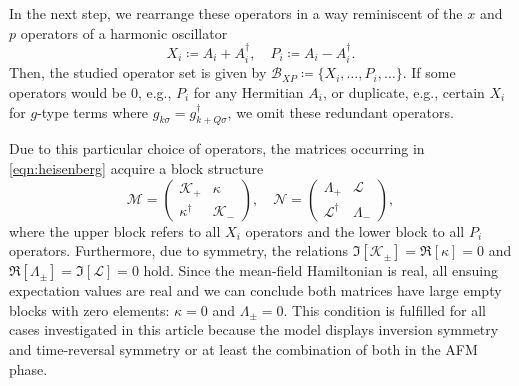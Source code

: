 \documentclass[
    reprint, 
    aps,
    preprintnumbers,
    twocolumn,
    prb,
    superscriptaddress
]{revtex4-2}
\newcommand{\mM}{\mathcal{M}}
\newcommand{\mN}{\mathcal{N}}
\begin{document}
In the next step, we rearrange these operators in a way reminiscent of the $x$ and $p$ operators
of a harmonic oscillator
\begin{equation}
    X_i \coloneqq  A_i + A_i^\dagger,\quad P_i \coloneqq  A_i - A_i^\dagger.
\end{equation}
Then, the studied operator set is given by $\mathcal{B}_{XP} \coloneqq \{ X_i, \ldots, P_i, \ldots \}$.
If some operators would be 0, e.g., $P_i$ for any Hermitian $A_i$, or duplicate, e.g., certain $X_i$ for $g$-type terms where $g_{k\sigma} = g_{k+Q\sigma}^\dagger$, we omit these redundant operators.

Due to this particular choice of operators, the matrices occurring in \eqref{eqn:heisenberg} acquire a block structure
\begin{equation}
    \label{eqn:xp_set}
    \mM = \begin{pmatrix}
        \mathcal{K}_+ & \kappa \\ \kappa^\dagger & \mathcal{K}_-
    \end{pmatrix},\quad \mN = \begin{pmatrix}
        \Lambda_+ & \mathcal{L} \\ \mathcal{L}^\dagger & \Lambda_-
    \end{pmatrix},
\end{equation}
where the upper block refers to all $X_i$ operators and the lower block to all $P_i$ operators.
Furthermore, due to symmetry, the relations $\Im [\mathcal{K}_\pm] = \Re [\kappa] = 0$ and $\Re [\Lambda_\pm] = \Im [\mathcal{L}] = 0$ hold.
Since the mean-field Hamiltonian is real, all ensuing expectation values are real
and we can conclude both matrices have large empty blocks with zero elements: $\kappa=0$ and $\Lambda_\pm=0$.
This condition is fulfilled for all cases investigated in this article because the model displays
inversion symmetry and time-reversal symmetry or at least the combination of both in the AFM phase.
\end{document}
